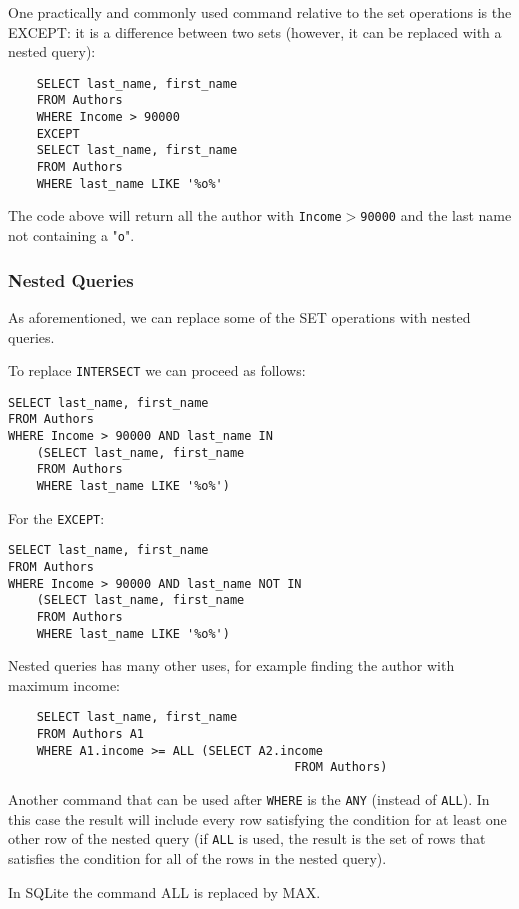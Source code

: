 \documentclass[a4page, 11pt]{article}
\theoremstyle{definition}
\begin{document}
One practically and commonly used command relative to the set operations is the EXCEPT: it is a difference between two sets (however, it can be replaced with a nested query):
\begin{lstlisting}
	SELECT last_name, first_name
	FROM Authors
	WHERE Income > 90000
	EXCEPT 
	SELECT last_name, first_name
	FROM Authors
	WHERE last_name LIKE '%o%' 
\end{lstlisting}
The code above will return all the author with \texttt{Income$>$90000} and the last name not containing a "\texttt{o}".

\subsubsection{Nested Queries}
As aforementioned, we can replace some of the SET operations with nested queries.

To replace \texttt{INTERSECT} we can proceed as follows:
\begin{lstlisting}
SELECT last_name, first_name
FROM Authors
WHERE Income > 90000 AND last_name IN 
	(SELECT last_name, first_name
	FROM Authors
	WHERE last_name LIKE '%o%')
\end{lstlisting}

For the \texttt{EXCEPT}:
\begin{lstlisting}
SELECT last_name, first_name
FROM Authors
WHERE Income > 90000 AND last_name NOT IN 
	(SELECT last_name, first_name
	FROM Authors
	WHERE last_name LIKE '%o%')
\end{lstlisting}

Nested queries has many other uses, for example finding the author with maximum income:
\begin{lstlisting}
	SELECT last_name, first_name
	FROM Authors A1
	WHERE A1.income >= ALL (SELECT A2.income
										FROM Authors)
\end{lstlisting}

Another command that can be used after \texttt{WHERE} is the \texttt{ANY} (instead of \texttt{ALL}). 
In this case the result will include every row satisfying the condition for at least one other row of the nested query (if \texttt{ALL} is used, the result is the set of rows that satisfies the condition for all of the rows in the nested query). 

In SQLite the command ALL is replaced by MAX.
\end{document}
